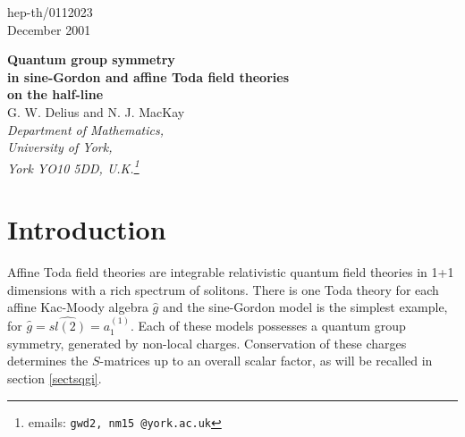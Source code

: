 \documentclass[a4paper,12pt]{article}
\newcommand{\uqgh}{U_q(\hat{g})}
\numberwithin{equation}{section}
\begin{document}
\baselineskip 16pt
\parindent 10pt
\parskip 6pt


\begin{flushright}
hep-th/0112023\\ December 2001\\[3mm]
\end{flushright}
\vspace{1cm}
\begin{center}
{\Large {\bf Quantum group symmetry \\[0.05in]in sine-Gordon and
affine Toda field theories\\
[0.1in]on the half-line}}\\ \vspace{1cm} {\large G. W. Delius and
N. J. MacKay}
\\
\vspace{3mm} {\em Department of Mathematics,\\ University of York,
\\York YO10 5DD, U.K.\footnote{emails: {\tt gwd2, nm15 @york.ac.uk} }}
\end{center}

\begin{abstract}
\noindent We consider the sine-Gordon and affine Toda field
theories on the half-line with classically integrable boundary
conditions, and show that in the quantum theory a remnant survives
of the bulk quantized affine algebra symmetry generated by
non-local charges. The paper also develops a general framework for
obtaining solutions of the reflection equation by solving an
intertwining property for representations of certain coideal
subalgebras of $\uqgh$.
\end{abstract}

\section{Introduction\label{sectint}}

Affine Toda field theories are integrable relativistic quantum
field theories in 1+1 dimensions with a rich spectrum of solitons.
There is one Toda theory for each affine Kac-Moody algebra
$\hat{g}$ and the sine-Gordon model is the simplest example, for
$\hat{g}=\widehat{sl(2)}=a_1^{(1)}$.
Each of these models possesses a quantum group symmetry, generated
by non-local charges. Conservation of these charges determines the
$S$-matrices up to an overall scalar factor, as will be recalled
in section \ref{sectsqgi}.
\end{document}
